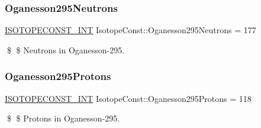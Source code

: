 \subsubsection{\texorpdfstring{Oganesson295\+Neutrons}{Oganesson295Neutrons}}
{\footnotesize\ttfamily \mbox{\hyperlink{group___isotope_const-_macros_ga5f18360b3e99483a35c32d789e62621c}{I\+S\+O\+T\+O\+P\+E\+C\+O\+N\+S\+T\+\_\+\+I\+NT}} Isotope\+Const\+::\+Oganesson295\+Neutrons = 177}

\$ \$ Neutrons in Oganesson-\/295. \mbox{\label{group___isotope_const-_oganesson-_og295_gad6097bd0fda633d094f8538c3295d647}} 
\subsubsection{\texorpdfstring{Oganesson295\+Protons}{Oganesson295Protons}}
{\footnotesize\ttfamily \mbox{\hyperlink{group___isotope_const-_macros_ga5f18360b3e99483a35c32d789e62621c}{I\+S\+O\+T\+O\+P\+E\+C\+O\+N\+S\+T\+\_\+\+I\+NT}} Isotope\+Const\+::\+Oganesson295\+Protons = 118}

\$ \$ Protons in Oganesson-\/295. 
